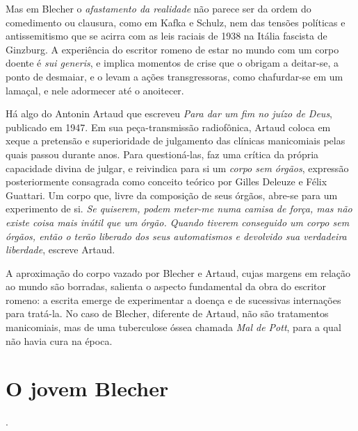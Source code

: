 Mas em Blecher o \textit{afastamento da realidade} não parece ser da ordem do comedimento ou clausura, como em Kafka e Schulz, nem das tensões políticas e  antissemitismo que se acirra com as leis raciais de 1938 na Itália fascista de Ginzburg. A experiência do escritor romeno de estar no mundo com um corpo doente é \textit{sui generis}, e implica momentos de crise que o obrigam a deitar-se, a ponto de desmaiar, e o levam a ações transgressoras, como chafurdar-se em um lamaçal, e nele adormecer até o anoitecer.

Há algo do Antonin Artaud que escreveu \textit{Para dar um fim no juízo de Deus}, publicado em 1947. Em sua peça-transmissão radiofônica, Artaud coloca em xeque a pretensão e superioridade de julgamento das clínicas manicomiais pelas quais passou durante anos. Para questioná-las, faz uma crítica da própria capacidade divina de julgar, e reivindica para si um \textit{corpo sem órgãos}, expressão posteriormente consagrada como conceito teórico por Gilles Deleuze e Félix Guattari. Um corpo que, livre da composição de seus órgãos, abre-se para um experimento de si. \textit{Se quiserem, podem meter-me numa camisa de força, mas não existe coisa mais inútil que um órgão. Quando tiverem conseguido um corpo sem órgãos, então o terão liberado dos seus automatismos e devolvido sua verdadeira liberdade}, escreve Artaud.

A aproximação do corpo vazado por Blecher e Artaud, cujas margens em relação ao mundo são borradas, salienta o aspecto fundamental da obra do escritor romeno: a escrita emerge de experimentar a doença e de sucessivas internações para tratá-la. No caso de Blecher, diferente de Artaud, não são tratamentos manicomiais, mas de uma tuberculose óssea chamada \textit{Mal de Pott}, para a qual não havia cura na época.

\section{O jovem Blecher}

.


